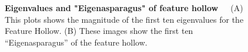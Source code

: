 \begin{figure}
    \centering
    \qquad
    \caption[First ten Eigenvalues and "Eigenasparagus" of Feature Hollow]{\textbf{Eigenvalues and "Eigenasparagus" of feature hollow}~~~(A) This plots shows the magnitude of the first ten eigenvalues for the Feature Hollow. (B) These images show the first ten “Eigenasparagus” of the feature hollow.}
    \label{fig:PCAhollow}
\end{figure}

